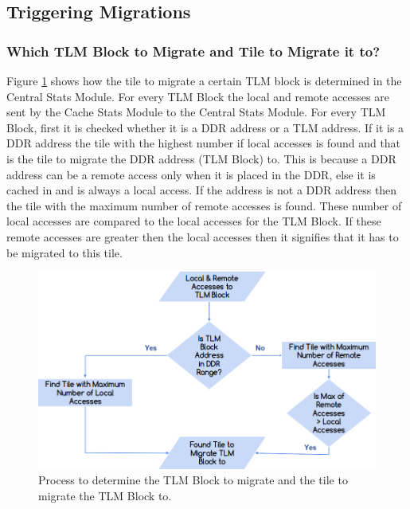 \documentclass{listhesis}
\begin{document}
\subsection{Triggering Migrations}
\subsubsection{Which TLM Block to Migrate and Tile to Migrate it to?}
Figure \ref{fig:tiletomigrate} shows how the tile to migrate a certain TLM block is determined in the Central Stats Module. For every TLM Block the local and remote accesses are sent by the Cache Stats Module to the Central Stats Module. For every TLM Block, first it is checked whether it is a DDR address or a TLM address. If it is a DDR address the tile with the highest number if local accesses is found and that is the tile to migrate the DDR address (TLM Block) to. This is because a DDR address can be a remote access only when it is placed in the DDR, else it is cached in and is always a local access. If the address is not a DDR address then the tile with the maximum number of remote accesses is found. These number of local accesses are compared to the local accesses for the TLM Block. If these remote accesses are greater then the local accesses then it signifies that it has to be migrated to this tile. \\
\begin{figure}
  \includegraphics[width=\linewidth]{tiletomigrate.png}
  \centering
  \caption{Process to determine the TLM Block to migrate and the tile to migrate the TLM Block to.}
  \label{fig:tiletomigrate}
\end{figure}
\end{document}
